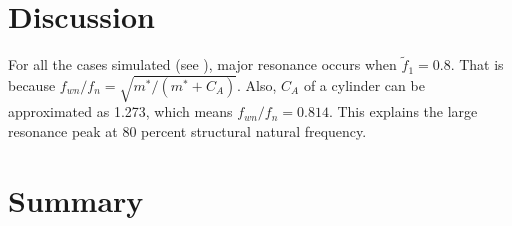 

\clearpage
\section{Discussion} \label{sec discussion}
For all the cases simulated (see ), major resonance occurs when $ \widetilde{f}_1=0.8 $. That is because $ f_{wn}/f_n=\sqrt{m^*/(m^*+C_A)} $. Also, $ C_A $ of a cylinder can be approximated as 1.273\cite{Techet2005c}, which means $ f_{wn}/f_n=0.814 $. This explains the large resonance peak at 80 percent structural natural frequency.


\section{Summary} \label{sec interconlude}

